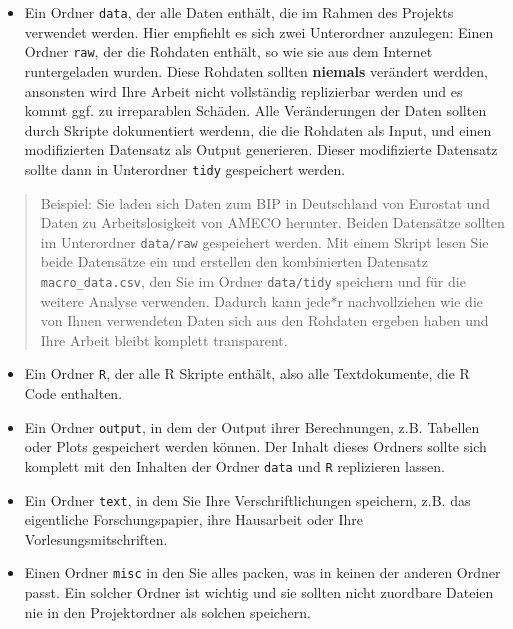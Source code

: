 \documentclass[]{book}
\providecommand{\tightlist}{%
  \setlength{\itemsep}{0pt}\setlength{\parskip}{0pt}}
\begin{document}
\begin{itemize}
\tightlist
\item
  Ein Ordner \texttt{data}, der alle Daten enthält, die im Rahmen des
  Projekts verwendet werden. Hier empfiehlt es sich zwei Unterordner
  anzulegen: Einen Ordner \texttt{raw}, der die Rohdaten enthält, so wie
  sie aus dem Internet runtergeladen wurden. Diese Rohdaten sollten
  \textbf{niemals} verändert werdden, ansonsten wird Ihre Arbeit nicht
  vollständig replizierbar werden und es kommt ggf. zu irreparablen
  Schäden. Alle Veränderungen der Daten sollten durch Skripte
  dokumentiert werdenn, die die Rohdaten als Input, und einen
  modifizierten Datensatz als Output generieren. Dieser modifizierte
  Datensatz sollte dann in Unterordner \texttt{tidy} gespeichert werden.
\end{itemize}

\begin{quote}
Beispiel: Sie laden sich Daten zum BIP in Deutschland von Eurostat und
Daten zu Arbeitslosigkeit von AMECO herunter. Beiden Datensätze sollten
im Unterordner \texttt{data/raw} gespeichert werden. Mit einem Skript
lesen Sie beide Datensätze ein und erstellen den kombinierten Datensatz
\texttt{macro\_data.csv}, den Sie im Ordner \texttt{data/tidy} speichern
und für die weitere Analyse verwenden. Dadurch kann jede*r
nachvollziehen wie die von Ihnen verwendeten Daten sich aus den Rohdaten
ergeben haben und Ihre Arbeit bleibt komplett transparent.
\end{quote}

\begin{itemize}
\item
  Ein Ordner \texttt{R}, der alle R Skripte enthält, also alle
  Textdokumente, die R Code enthalten.
\item
  Ein Ordner \texttt{output}, in dem der Output ihrer Berechnungen, z.B.
  Tabellen oder Plots gespeichert werden können. Der Inhalt dieses
  Ordners sollte sich komplett mit den Inhalten der Ordner \texttt{data}
  und \texttt{R} replizieren lassen.
\item
  Ein Ordner \texttt{text}, in dem Sie Ihre Verschriftlichungen
  speichern, z.B. das eigentliche Forschungspapier, ihre Hausarbeit oder
  Ihre Vorlesungsmitschriften.
\item
  Einen Ordner \texttt{misc} in den Sie alles packen, was in keinen der
  anderen Ordner passt. Ein solcher Ordner ist wichtig und sie sollten
  nicht zuordbare Dateien nie in den Projektordner als solchen
  speichern.
\end{itemize}
\end{document}
